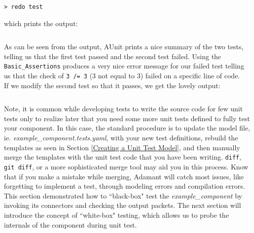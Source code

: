 \vspace{5mm} %
\begin{verbatim}
> redo test
\end{verbatim}
\vspace{5mm} %

which prints the output:

\vspace{5mm} %
\inputminted{text}{../example_architecture/example_component/test/output.txt}
\vspace{5mm} %

As can be seen from the output, AUnit prints a nice summary of the two tests, telling us that the first test passed and the second test failed. Using the \texttt{Basic\_Assertions} produces a very nice error message for our failed test telling us that the check of \texttt{3 /= 3} (3 not equal to 3) failed on a specific line of code. \\

If we modify the second test so that it passes, we get the lovely output:

\vspace{5mm} %
\inputminted{text}{../example_architecture/example_component/test2/output.txt}
\vspace{5mm} %

Note, it is common while developing tests to write the source code for few unit tests only to realize later that you need some more unit tests defined to fully test your component. In this case, the standard procedure is to update the model file, ie. \textit{example\_component.tests.yaml}, with your new test definitions, rebuild the templates as seen in Section \ref{Creating a Unit Test Model}, and then manually merge the templates with the unit test code that you have been writing. \texttt{diff}, \texttt{git diff}, or a more sophisticated merge tool may aid you in this process. Know that if you make a mistake while merging, Adamant will catch most issues, like forgetting to implement a test, through modeling errors and compilation errors. \\

This section demonstrated how to ``black-box" test the \textit{example\_component} by invoking its connectors and checking the output packets. The next section will introduce the concept of ``white-box" testing, which allows us to probe the internals of the component during unit test.

